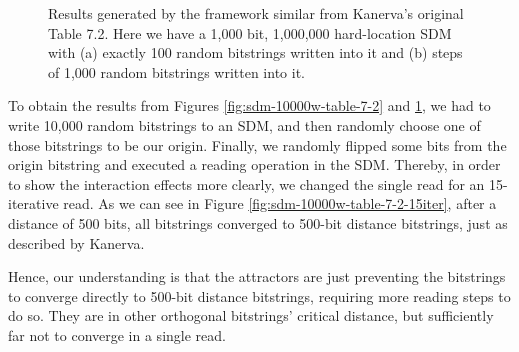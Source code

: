 \begin{figure}[h]
\centering
{}

\caption{Results generated by the framework similar from Kanerva's original Table 7.2. Here we have a 1,000 bit, 1,000,000 hard-location SDM with (a) exactly 100 random bitstrings written into it and (b) steps of 1,000 random bitstrings written into it.
\label{fig:sdm-100w-table-7-2}}
\end{figure}

To obtain the results from Figures \ref{fig:sdm-10000w-table-7-2} and \ref{fig:sdm-100w-table-7-2}, we had to write 10,000 random bitstrings to an SDM, and then randomly choose one of those bitstrings to be our origin. Finally, we randomly flipped some bits from the origin bitstring and executed a reading operation in the SDM. Thereby, in order to show the interaction effects more clearly, we changed the single read for an 15-iterative read. As we can see in Figure \ref{fig:sdm-10000w-table-7-2-15iter}, after a distance of 500 bits, all bitstrings converged to 500-bit distance bitstrings, just as described by Kanerva.

Hence, our understanding is that the attractors are just preventing the bitstrings to converge directly to 500-bit distance bitstrings, requiring more reading steps to do so. They are in other orthogonal bitstrings' critical distance, but sufficiently far not to converge in a single read.

